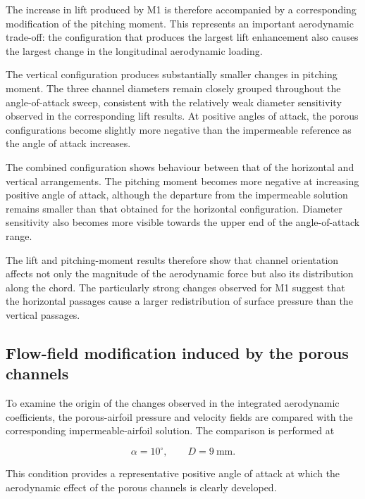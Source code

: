 \documentclass[a4paper,fleqn]{cas-dc}
\begin{document}
The increase in lift produced by M1 is therefore accompanied by a
corresponding modification of the pitching moment. This represents an
important aerodynamic trade-off: the configuration that produces the
largest lift enhancement also causes the largest change in the
longitudinal aerodynamic loading.

The vertical configuration produces substantially smaller changes in
pitching moment. The three channel diameters remain closely grouped
throughout the angle-of-attack sweep, consistent with the relatively
weak diameter sensitivity observed in the corresponding lift results.
At positive angles of attack, the porous configurations become
slightly more negative than the impermeable reference as the angle of
attack increases.

The combined configuration shows behaviour between that of the
horizontal and vertical arrangements. The pitching moment becomes more
negative at increasing positive angle of attack, although the departure
from the impermeable solution remains smaller than that obtained for
the horizontal configuration. Diameter sensitivity also becomes more
visible towards the upper end of the angle-of-attack range.

The lift and pitching-moment results therefore show that channel
orientation affects not only the magnitude of the aerodynamic force
but also its distribution along the chord. The particularly strong
changes observed for M1 suggest that the horizontal passages cause a
larger redistribution of surface pressure than the vertical passages.



\subsection{Flow-field modification induced by the porous channels}
\label{subsec:flowfield_results}

To examine the origin of the changes observed in the integrated
aerodynamic coefficients, the porous-airfoil pressure and velocity
fields are compared with the corresponding impermeable-airfoil
solution. The comparison is performed at

\begin{equation}
	\alpha=10^\circ,
	\qquad
	D=9~\mathrm{mm}.
\end{equation}

This condition provides a representative positive angle of attack at
which the aerodynamic effect of the porous channels is clearly
developed.
\end{document}
